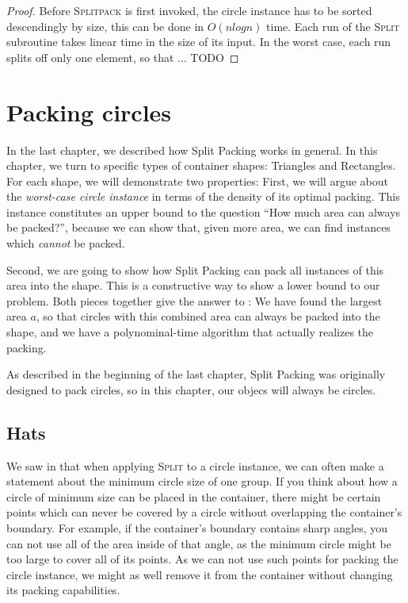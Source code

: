 \documentclass[a4paper,style=print,oneside,bibliography=totoc,nexus,lnum,extramargin]{tubsbook}
\begin{document}
\begin{proof}
    Before \textsc{Splitpack} is first invoked, the circle instance has to be sorted descendingly by size, this can be done in $O(n log n)$ time. Each run of the \textsc{Split} subroutine takes linear time in the size of its input. In the worst case, each run splits off only one element, so that ... TODO
\end{proof}

\chapter{Packing circles}\label{ch:circles}

In the last chapter, we described how Split Packing works in general. In this chapter, we turn to specific types of container shapes: Triangles and Rectangles. For each shape, we will demonstrate two properties: First, we will argue about the \emph{worst-case circle instance} in terms of the density of its optimal packing. This instance constitutes an upper bound to the question “How much area can always be packed?”, because we can show that, given more area, we can find instances which \emph{cannot} be packed.

Second, we are going to show how Split Packing can pack all instances of this area into the shape. This is a constructive way to show a lower bound to our problem. Both pieces together give the answer to : We have found the largest area $a$, so that circles with this combined area can always be packed into the shape, and we have a polynominal-time algorithm that actually realizes the packing.

As described in the beginning of the last chapter, Split Packing was originally designed to pack circles, so in this chapter, our objecs will always be circles.


\section{Hats}

We saw in  that when applying \textsc{Split} to a circle instance, we can often make a statement about the minimum circle size of one group.
If you think about how a circle of minimum size can be placed in the container, there might be certain points which can never be covered by a circle without overlapping the container's boundary. For example, if the container's boundary contains sharp angles, you can not use all of the area inside of that angle, as the minimum circle might be too large to cover all of its points. As we can not use such points for packing the circle instance, we might as well remove it from the container without changing its packing capabilities.
\end{document}
